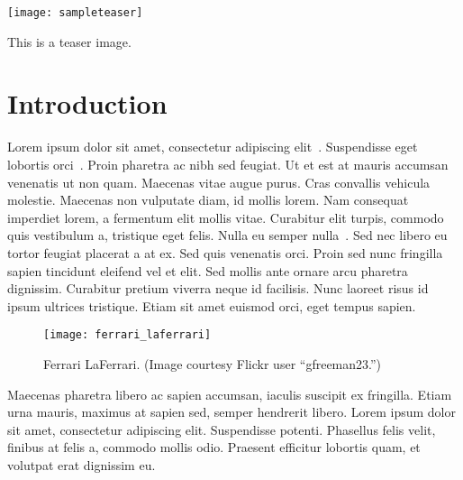 \documentclass[sigconf]{acmart}
\begin{document}



\begin{teaserfigure}
  \texttt{[image: sampleteaser]}
  \caption{This is a teaser image.}
  \label{fig:teaser}
\end{teaserfigure}


\maketitle

\section{Introduction}

Lorem ipsum dolor sit amet, consectetur adipiscing elit~\cite{Pellacini:2005:LAH}. Suspendisse eget lobortis orci~\cite{Boechat:2016:RSP:2980179.2980227}. Proin pharetra ac nibh sed feugiat. Ut et est at mauris accumsan venenatis ut non quam. Maecenas vitae augue purus. Cras convallis vehicula molestie. Maecenas non vulputate diam, id mollis lorem. Nam consequat imperdiet lorem, a fermentum elit mollis vitae. Curabitur elit turpis, commodo quis vestibulum a, tristique eget felis. Nulla eu semper nulla~\cite{notes2002, Jobson95}. Sed nec libero eu tortor feugiat placerat a at ex. Sed quis venenatis orci. Proin sed nunc fringilla sapien tincidunt eleifend vel et elit. Sed mollis ante ornare arcu pharetra dignissim. Curabitur pretium viverra neque id facilisis. Nunc laoreet risus id ipsum ultrices tristique. Etiam sit amet euismod orci, eget tempus sapien.

\begin{figure}[ht]
  \centering
  \texttt{[image: ferrari\_laferrari]}
  \caption{Ferrari LaFerrari. (Image courtesy Flickr user ``gfreeman23.'')}
  \label{fig:ferrari}
\end{figure}

Maecenas pharetra libero ac sapien accumsan, iaculis suscipit ex fringilla. Etiam urna mauris, maximus at sapien sed, semper hendrerit libero. Lorem ipsum dolor sit amet, consectetur adipiscing elit. Suspendisse potenti. Phasellus felis velit, finibus at felis a, commodo mollis odio. Praesent efficitur lobortis quam, et volutpat erat dignissim eu. 
\end{document}
